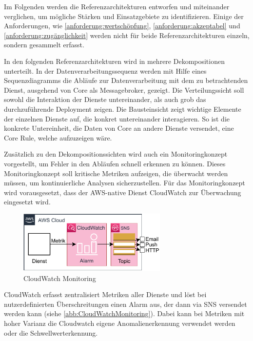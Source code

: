 Im Folgenden werden die Referenzarchitekturen entworfen und miteinander verglichen, um mögliche Stärken und Einsatzgebiete zu identifizieren. Einige der Anforderungen, wie \ref{anforderung:wertschöpfung}, \ref{anforderung:akzeptabel} und \ref{anforderung:zugänglichkeit} werden nicht für beide Referenzarchitekturen einzeln, sondern gesammelt erfasst.

In den folgenden Referenzarchitekturen wird in mehrere Dekompositionen unterteilt. In der Datenverarbeitungssequenz werden mit Hilfe eines Sequenzdiagramms die Abläufe zur Datenverarbeitung mit dem zu betrachtenden Dienst, ausgehend von \AWSIOT{} Core als Messagebroker, gezeigt.
Die Verteilungssicht soll sowohl die Interaktion der Dienste untereinander, als auch grob das durchzuführende Deployment zeigen. Die Bausteinsicht zeigt wichtige Elemente der einzelnen Dienste auf, die konkret untereinander interagieren. So ist die konkrete Untereinheit, die Daten von \AWSIOT{} Core an andere Dienste versendet, eine \AWSIOT{} Core Rule, welche aufzuzeigen wäre.

Zusätzlich zu den Dekompositionssichten wird auch ein Monitoringkonzept vorgestellt, um Fehler in den Abläufen schnell erkennen zu können. Dieses Monitoringkonzept soll kritische Metriken aufzeigen, die überwacht werden müssen, um kontinuierliche Analysen sicherzustellen. Für das Monitoringkonzept wird vorausgesetzt, dass der \ac{AWS}-native Dienst CloudWatch zur Überwachung eingesetzt wird. 
\begin{figure}[H]
\centering
\includegraphics[width=0.66\textwidth]{graphics/CloudWatch-Monitoring}
\caption{CloudWatch Monitoring}
\label{abb:CloudWatchMonitoring}
\end{figure}
CloudWatch erfasst zentralisiert Metriken aller Dienste und löst bei nutzerdefinierten Überschreitungen einen Alarm aus, der dann via \ac{SNS} versendet werden kann (siehe \autoref{abb:CloudWatchMonitoring}). Dabei kann bei Metriken mit hoher Varianz die Cloudwatch eigene Anomalienerkennung verwendet werden oder die Schwellwerterkennung.



